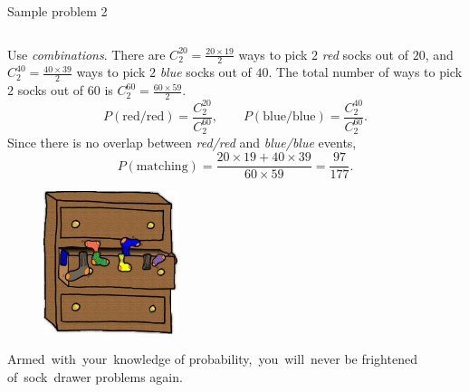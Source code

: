 \documentclass[9pt,aspectratio=169]{beamer}
\begin{document}
\begin{frame}{Sample problem 2}
\begin{columns}[T]
\begin{column}{0.5\textwidth}
      Use \emph{combinations}. There are $C_2^{20} = \frac{20 \times 19}{2}$ ways to pick $2$ \emph{red} socks out of $20$, and $C_2^{40} = \frac{40 \times 39}{2}$ ways to pick $2$ \emph{blue} socks out of $40$. The total number of ways to pick $2$ socks out of $60$ is $C_2^{60} = \frac{60 \times 59}{2}$.\vspace*{-1.5ex}
      {\small\[ P(\text{red/red}) = \frac{C_2^{20}}{C_2^{60}}, \qquad P(\text{blue/blue}) = \frac{C_2^{40}}{C_2^{60}}. \]}
      Since there is no overlap between \emph{red/red} and \emph{blue/blue} events, 
      {\small \[ P(\text{matching}) = \frac{20 \times 19 + 40 \times 39}{60 \times 59} = \frac{97}{177}. \]}
      \begin{figure}%
        \vspace{-2em}
        \includegraphics[width=0.35\textwidth]{03 - Probability/sock-drawer.png}
      \end{figure}
      
      Armed~with~your~knowledge of probability,~you~will~never be frightened of~sock~drawer problems again.
    \end{column}
  \end{columns}
\end{frame}
\end{document}
